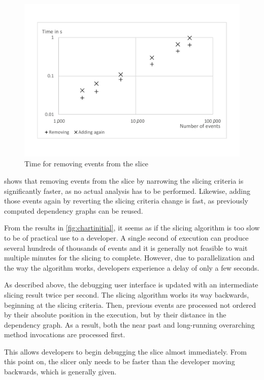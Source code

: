 \begin{figure}
	\centering
		\includegraphics[width=\linewidth, clip, trim={20mm 26mm 20mm 26mm}]{img/chart-rem.pdf}
	\caption{Time for removing events from the slice}
	\label{fig:chartrem}
\end{figure}

 shows that removing events from the slice by narrowing the slicing criteria is significantly faster, as no actual analysis has to be performed.
Likewise, adding those events again by reverting the slicing criteria change is fast, as previously computed dependency graphs can be reused.

\medskip

From the results in \cref{fig:chartinitial}, it seems as if the slicing algorithm is too slow to be of practical use to a developer.
A single second of execution can produce several hundreds of thousands of events and it is generally not feasible to wait multiple minutes for the slicing to complete.
However, due to parallelization and the way the algorithm works, developers experience a delay of only a few seconds.

As described above, the debugging user interface is updated with an intermediate slicing result twice per second.
The slicing algorithm works its way backwards, beginning at the slicing criteria.
Then, previous events are processed not ordered by their absolute position in the execution, but by their distance in the dependency graph.
As a result, both the near past and long-running overarching method invocations are processed first.

This allows developers to begin debugging the slice almost immediately. 
From this point on, the slicer only needs to be faster than the developer moving backwards, which is generally given.

